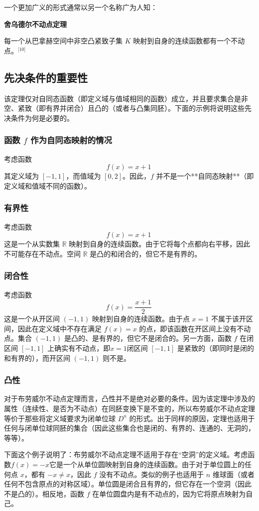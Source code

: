 一个更加广义的形式通常以另一个名称广为人知：

\textbf{舍乌德尔不动点定理}

每一个从巴拿赫空间中非空凸紧致子集 $K$ 映射到自身的连续函数都有一个不动点。\(^\text{[10]}\)
\subsection{先决条件的重要性}
该定理仅对自同态函数（即定义域与值域相同的函数）成立，并且要求集合是非空、紧致（即有界并闭合）且凸的（或者与凸集同胚）。下面的示例将说明这些先决条件为何是必要的。
\subsubsection{函数 $f$ 作为自同态映射的情况}
考虑函数
$$
f(x) = x + 1~
$$
其定义域为 $[-1, 1]$，而值域为 $[0, 2]$。因此，$f$ 并不是一个**自同态映射**（即定义域和值域不同的函数）。
\subsubsection{有界性}
考虑函数
$$
f(x) = x + 1~
$$
这是一个从实数集 $\mathbb{R}$ 映射到自身的连续函数。由于它将每个点都向右平移，因此不可能存在不动点。空间 $\mathbb{R}$ 是凸的和闭合的，但它不是有界的。
\subsubsection{闭合性}
考虑函数
$$
f(x) = \frac{x + 1}{2}~
$$
这是一个从开区间 $(-1, 1)$ 映射到自身的连续函数。由于点 $x = 1$ 不属于该开区间，因此在定义域中不存在满足 $f(x) = x$ 的点，即该函数在开区间上没有不动点。集合 $(-1, 1)$ 是凸的、是有界的，但它不是闭合的。另一方面，函数 $f$ 在闭区间 $[-1, 1]$ 上确实有不动点，即$x = 1$闭区间 $[-1, 1]$ 是紧致的（即同时是闭的和有界的），而开区间 $(-1, 1)$ 则不是。
\subsubsection{凸性}
对于布劳威尔不动点定理而言，凸性并不是绝对必要的条件。因为该定理中涉及的属性（连续性、是否为不动点）在同胚变换下是不变的，所以布劳威尔不动点定理等价于那些将定义域要求为闭单位球 $D^n$ 的形式。出于同样的原因，定理也适用于任何与闭单位球同胚的集合（因此这些集合也是闭的、有界的、连通的、无洞的，等等）。

下面这个例子说明了：布劳威尔不动点定理不适用于存在“空洞”的定义域。考虑函数$f(x) = -x$它是一个从单位圆映射到自身的连续函数。由于对于单位圆上的任何点 $x$，都有 $-x \ne x$，因此 $f$ 没有不动点。类似的例子也适用于 $n$ 维球面（或者任何不包含原点的对称区域）。单位圆是闭合且有界的，但它存在一个空洞（因此不是凸的）。相反地，函数 $f$ 在单位圆盘内是有不动点的，因为它将原点映射为自己。

